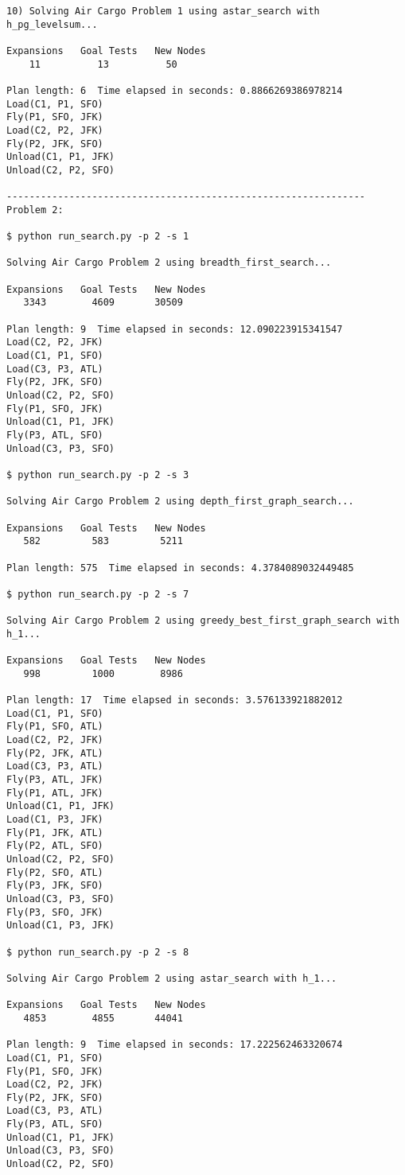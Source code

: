 \documentclass[11pt]{scrartcl}
\begin{document}
\begin{verbatim}
10) Solving Air Cargo Problem 1 using astar_search with h_pg_levelsum...

Expansions   Goal Tests   New Nodes
    11          13          50

Plan length: 6  Time elapsed in seconds: 0.8866269386978214
Load(C1, P1, SFO)
Fly(P1, SFO, JFK)
Load(C2, P2, JFK)
Fly(P2, JFK, SFO)
Unload(C1, P1, JFK)
Unload(C2, P2, SFO)

---------------------------------------------------------------
Problem 2:

$ python run_search.py -p 2 -s 1

Solving Air Cargo Problem 2 using breadth_first_search...

Expansions   Goal Tests   New Nodes
   3343        4609       30509

Plan length: 9  Time elapsed in seconds: 12.090223915341547
Load(C2, P2, JFK)
Load(C1, P1, SFO)
Load(C3, P3, ATL)
Fly(P2, JFK, SFO)
Unload(C2, P2, SFO)
Fly(P1, SFO, JFK)
Unload(C1, P1, JFK)
Fly(P3, ATL, SFO)
Unload(C3, P3, SFO)

$ python run_search.py -p 2 -s 3

Solving Air Cargo Problem 2 using depth_first_graph_search...

Expansions   Goal Tests   New Nodes
   582         583         5211

Plan length: 575  Time elapsed in seconds: 4.3784089032449485

$ python run_search.py -p 2 -s 7

Solving Air Cargo Problem 2 using greedy_best_first_graph_search with h_1...

Expansions   Goal Tests   New Nodes
   998         1000        8986

Plan length: 17  Time elapsed in seconds: 3.576133921882012
Load(C1, P1, SFO)
Fly(P1, SFO, ATL)
Load(C2, P2, JFK)
Fly(P2, JFK, ATL)
Load(C3, P3, ATL)
Fly(P3, ATL, JFK)
Fly(P1, ATL, JFK)
Unload(C1, P1, JFK)
Load(C1, P3, JFK)
Fly(P1, JFK, ATL)
Fly(P2, ATL, SFO)
Unload(C2, P2, SFO)
Fly(P2, SFO, ATL)
Fly(P3, JFK, SFO)
Unload(C3, P3, SFO)
Fly(P3, SFO, JFK)
Unload(C1, P3, JFK)

$ python run_search.py -p 2 -s 8

Solving Air Cargo Problem 2 using astar_search with h_1...

Expansions   Goal Tests   New Nodes
   4853        4855       44041

Plan length: 9  Time elapsed in seconds: 17.222562463320674
Load(C1, P1, SFO)
Fly(P1, SFO, JFK)
Load(C2, P2, JFK)
Fly(P2, JFK, SFO)
Load(C3, P3, ATL)
Fly(P3, ATL, SFO)
Unload(C1, P1, JFK)
Unload(C3, P3, SFO)
Unload(C2, P2, SFO)


\end{verbatim}
\end{document}
